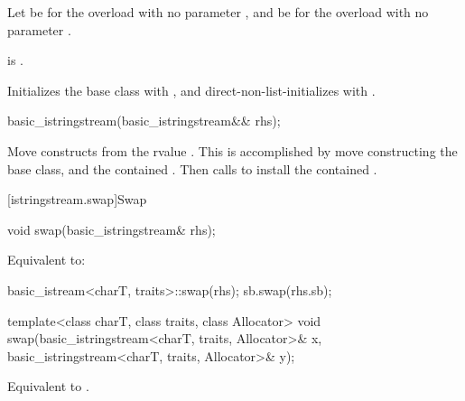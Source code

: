 \begin{itemdescr}
\pnum
Let  be 
for the overload with no parameter , and
 be  for the overload with no parameter .

\pnum
\constraints
{}
is .

\pnum
\effects
Initializes the base class with , and
direct-non-list-initializes  with .
\end{itemdescr}

%
\begin{itemdecl}
basic_istringstream(basic_istringstream&& rhs);
\end{itemdecl}

\begin{itemdescr}
\pnum
\effects
Move constructs from the rvalue . This
is accomplished by move constructing the base class, and the contained
.
Then calls 
to install the contained .
\end{itemdescr}

[istringstream.swap]{Swap}

%
\begin{itemdecl}
void swap(basic_istringstream& rhs);
\end{itemdecl}

\begin{itemdescr}
\pnum
\effects
Equivalent to:
\begin{codeblock}
basic_istream<charT, traits>::swap(rhs);
sb.swap(rhs.sb);
\end{codeblock}
\end{itemdescr}


%
\begin{itemdecl}
template<class charT, class traits, class Allocator>
  void swap(basic_istringstream<charT, traits, Allocator>& x,
            basic_istringstream<charT, traits, Allocator>& y);
\end{itemdecl}

\begin{itemdescr}
\pnum
\effects
Equivalent to .
\end{itemdescr}

